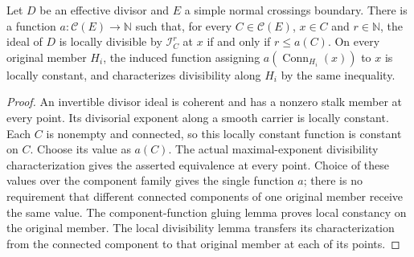 \begin{theorem}
\label{hir:connected-boundary-component-multiplicities}
\leanok
Let \(D\) be an effective divisor and \(E\) a simple normal crossings
boundary. There is a function \(a:\mathcal C(E)\to\mathbb N\) such that,
for every \(C\in\mathcal C(E)\), \(x\in C\) and \(r\in\mathbb N\),
the ideal of \(D\) is locally divisible by \(\mathcal I_C^r\) at \(x\)
if and only if \(r\le a(C)\).
On every original member \(H_i\), the induced function assigning
\(a(\operatorname{Conn}_{H_i}(x))\) to \(x\) is locally constant, and
characterizes divisibility along \(H_i\) by the same inequality.
\end{theorem}
\begin{proof}
An invertible divisor ideal is coherent and has a nonzero stalk member at
every point. Its divisorial exponent along a smooth carrier is locally
constant. Each \(C\) is nonempty and connected, so this locally constant
function is constant on \(C\). Choose its value as \(a(C)\). The actual
maximal-exponent divisibility characterization gives the asserted equivalence
at every point. Choice of these values over the component family gives the
single function \(a\); there is no requirement that different connected
components of one original member receive the same value.
The component-function gluing lemma proves local constancy on the original
member. The local divisibility lemma transfers its characterization from
the connected component to that original member at each of its points.
\end{proof}

